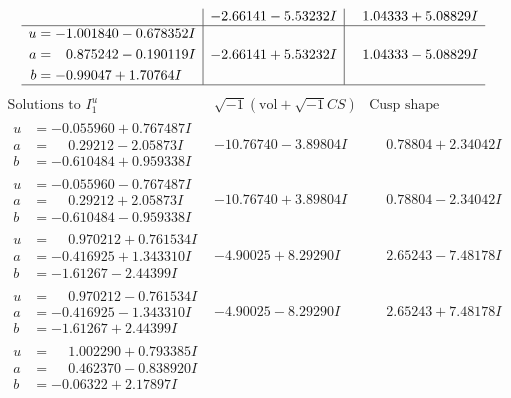 \documentclass[1p]{elsarticle_modified}
\theoremstyle{definition}
\newcommand{\I}{\sqrt{-1}}
\begin{document}
$$\begin{array}{c|c|c}
 & -2.66141 - 5.53232 I & \phantom{-}1.04333 + 5.08829 I \\ \hline\begin{aligned}
u &= -1.001840 - 0.678352 I \\
a &= \phantom{-}0.875242 - 0.190119 I \\
b &= -0.99047 + 1.70764 I\end{aligned}
 & -2.66141 + 5.53232 I & \phantom{-}1.04333 - 5.08829 I\\
 \hline 
 \end{array}$$\newpage$$\begin{array}{c|c|c}  
\text{Solutions to }I^u_{1}& \I (\text{vol} + \sqrt{-1}CS) & \text{Cusp shape}\\
 \hline 
\begin{aligned}
u &= -0.055960 + 0.767487 I \\
a &= \phantom{-}0.29212 - 2.05873 I \\
b &= -0.610484 + 0.959338 I\end{aligned}
 & -10.76740 - 3.89804 I & \phantom{-}0.78804 + 2.34042 I \\ \hline\begin{aligned}
u &= -0.055960 - 0.767487 I \\
a &= \phantom{-}0.29212 + 2.05873 I \\
b &= -0.610484 - 0.959338 I\end{aligned}
 & -10.76740 + 3.89804 I & \phantom{-}0.78804 - 2.34042 I \\ \hline\begin{aligned}
u &= \phantom{-}0.970212 + 0.761534 I \\
a &= -0.416925 + 1.343310 I \\
b &= -1.61267 - 2.44399 I\end{aligned}
 & -4.90025 + 8.29290 I & \phantom{-}2.65243 - 7.48178 I \\ \hline\begin{aligned}
u &= \phantom{-}0.970212 - 0.761534 I \\
a &= -0.416925 - 1.343310 I \\
b &= -1.61267 + 2.44399 I\end{aligned}
 & -4.90025 - 8.29290 I & \phantom{-}2.65243 + 7.48178 I \\ \hline\begin{aligned}
u &= \phantom{-}1.002290 + 0.793385 I \\
a &= \phantom{-}0.462370 - 0.838920 I \\
b &= -0.06322 + 2.17897 I\end{aligned}

\end{array}$$
\end{document}
